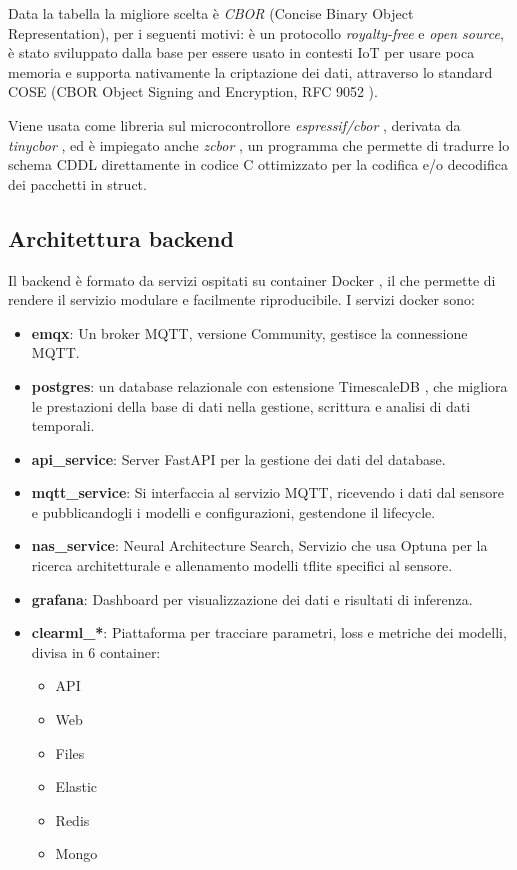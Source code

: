 Data la tabella la migliore scelta è \textit{CBOR} (Concise Binary Object Representation), per i seguenti motivi: è un protocollo \textit{royalty-free} e \textit{open source}, è stato sviluppato dalla base per essere usato in contesti IoT per usare poca memoria e supporta nativamente la criptazione dei dati, attraverso lo standard COSE (CBOR Object Signing and Encryption, RFC 9052 \cite{schaad2022cose}).


Viene usata come libreria sul microcontrollore \textit{espressif/cbor} \cite{espressif_cbor}, derivata da \textit{tinycbor} \cite{tinycbor}, ed è impiegato anche \textit{zcbor} \cite{zcbor}, un programma che permette di tradurre lo schema CDDL \cite{birkholz2019cddl} direttamente in codice C ottimizzato per la codifica e/o decodifica dei pacchetti in struct.

\begin{samepage}
	
\section{Architettura backend}
Il backend è formato da servizi ospitati su container Docker \cite{merkel2014docker}, il che permette di rendere il servizio modulare e facilmente riproducibile.
I servizi docker sono:

\begin{itemize}

	\item \textbf{emqx}: \cite{emqx} Un broker MQTT, versione Community, gestisce la connessione MQTT.
	\item \textbf{postgres}: \cite{postgresql} un database relazionale con estensione TimescaleDB \cite{timescaledb}, che migliora le prestazioni della base di dati nella gestione, scrittura e analisi di dati temporali.
	\item \textbf{api\_service}: Server FastAPI \cite{fastapi} per la gestione dei dati del database.
	\item \textbf{mqtt\_service}: Si interfaccia al servizio MQTT, ricevendo i dati dal sensore e pubblicandogli i modelli e configurazioni, gestendone il lifecycle.
	\item \textbf{nas\_service}: Neural Architecture Search, Servizio che usa Optuna \cite{optuna2019} per la ricerca architetturale e allenamento modelli tflite \cite{david2021tflitemicro} specifici al sensore.
	\item \textbf{grafana}: \cite{grafana} Dashboard per visualizzazione dei dati e risultati di inferenza.
	\item \textbf{clearml\_*}: \cite{clearml} Piattaforma per tracciare parametri, loss e metriche dei modelli, divisa in 6 container:
	\begin{itemize}
		\item API
		\item Web
		\item Files
		\item Elastic
		\item Redis
		\item Mongo
	\end{itemize}

\end{itemize}
\end{samepage}


